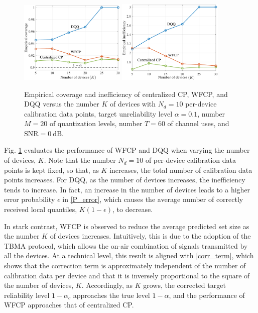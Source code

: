 \documentclass[12pt, draftclsnofoot, onecolumn]{IEEEtran}
\begin{document}
\begin{figure}[t]
    \centering
    {
	\includegraphics[width = 0.45\textwidth]{./figures/cover_K_fixNd.pdf}
	\includegraphics[width = 0.45\textwidth]{./figures/ineff_K_fixNd.pdf}
    }
    \caption{Empirical coverage and inefficiency of centralized CP, WFCP, and DQQ \cite{FedCP-QQ} versus the number $K$ of devices with $N_d=10$ per-device calibration data points, target unreliability level $\alpha=0.1$, number $M=20$ of quantization levels, number $T=60$ of channel uses, and $\text{SNR}=0~\text{dB}$.}
    \label{performance_K_fixNd}
\end{figure}

Fig. \ref{performance_K_fixNd} evaluates the performance of WFCP and DQQ when varying the number of devices, $K$.  Note that the number $N_d=10$ of per-device calibration data points is kept fixed, so that, as $K$ increases, the total number of calibration data points increases. For DQQ, as the number of devices increases, the inefficiency tends to increase. In fact, an increase in the number of devices leads to a higher error probability $\epsilon$ in \eqref{P_error}, which causes the average number of correctly received local quantiles, $K(1-\epsilon)$, to decrease.

In stark contrast, WFCP is observed to reduce the average predicted set size as the number $K$ of devices increases. Intuitively, this is due to the adoption of the TBMA protocol, which allows the on-air combination of signals transmitted by all the devices. At a technical level, this result is aligned with \eqref{corr_term}, which shows that the correction term is approximately independent of the number of calibration data per device and that it is inversely proportional to the square of the number of devices, $K$. Accordingly, as $K$ grows, the corrected target reliability level $1-\alpha_c$ approaches the true level $1-\alpha$, and the performance of WFCP approaches that of centralized CP.
\end{document}

